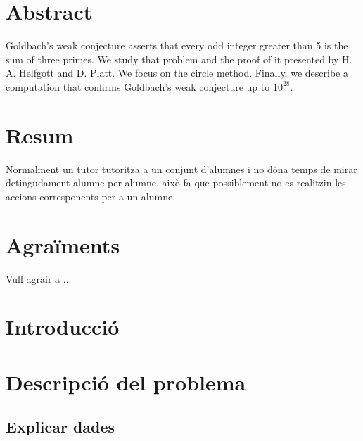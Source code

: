 \documentclass[11pt,a4paper,catalan]{article}
\begin{document}


\section*{Abstract}

Goldbach's weak conjecture asserts that every odd integer greater than 5 is the sum of three primes. We study that problem and the proof of it presented by H. A. Helfgott and D. Platt. We focus on the circle method. Finally, we describe a computation that confirms Goldbach's weak conjecture up to $10^{28}$.

\section*{Resum}
Normalment un tutor tutoritza a un conjunt d'alumnes i no dóna temps de mirar detingudament alumne per alumne, això fa que possiblement no es realitzin les accions corresponents per a un alumne. 



\newpage 

\section*{Agraïments}

Vull agrair a ... 

\newpage
\thispagestyle{empty}
{\hypersetup{linkcolor=black}
	\tableofcontents
}
\thispagestyle{empty}
\newpage

\setcounter{page}{1}


\section{Introducció}
\newpage
\section{Descripció del problema}
\subsection{Explicar dades} 
\end{document}
